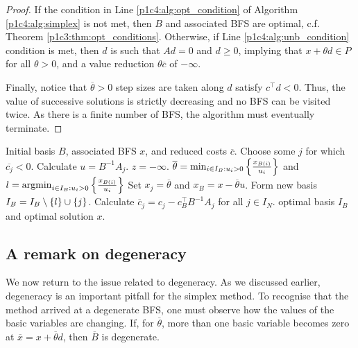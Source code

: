 \begin{proof}
	If the condition in Line \ref{p1c4:alg:opt_condition} of Algorithm \ref{p1c4:alg:simplex} is not met, then $B$ and associated BFS are optimal, c.f. Theorem \ref{p1c3:thm:opt_conditions}. Otherwise, if Line \ref{p1c4:alg:unb_condition} condition is met, then $d$ is such that $Ad = 0$ and $d \geq 0$, implying that $x + \theta d \in P$ for all $\theta > 0$, and a value reduction $\theta\overline{c}$ of $-\infty$.
	
	Finally, notice that $\overline{\theta}>0$ step sizes are taken along $d$ satisfy $c^\top d < 0$. Thus, the value of successive solutions is strictly decreasing and no BFS can be visited twice. As there is a finite number of BFS, the algorithm must eventually terminate.
\end{proof}

\begin{algorithm}[h]
	\caption{Simplex method} \label{p1c4:alg:simplex}
	\begin{algorithmic}[1] %
		 Initial basis $B$, associated BFS $x$, and reduced costs $\overline{c}$.
		 \label{p1c4:alg:opt_condition} 
		    \State Choose some $j$ for which $\overline{c_j} < 0$. Calculate $u = B^{-1}A_j$. 
		     \label{p1c4:alg:unb_condition}
				 $z = -\infty$.		
			\Else
				\State $\overline{\theta} = \min_{i \in I_B : u_i > 0} \left\{ \frac{x_{B(i)}}{u_i} \right \}$ and $l = \mathop{\rm argmin}_{i \in I_B : u_i > 0} \left\{ \frac{x_{B(i)}}{u_i} \right \}$ 
				\State Set $x_j = \overline{\theta}$ and $x_B = x - \overline{\theta}u$. Form new basis $I_B = I_B \setminus \left\{ l \right \} \cup \left\{ j \right \}$.  
				\State Calculate $\overline{c}_j = c_j - c_B^\top B^{-1}A_j$ for all $j \in I_N$.
			\EndIf
		\EndWhile
		 optimal basis $I_B$ and optimal solution $x$.
	\end{algorithmic}
\end{algorithm}


\subsection{A remark on degeneracy}

We now return to the issue related to degeneracy. As we discussed earlier, degeneracy is an important pitfall for the simplex method. To recognise that the method arrived at a degenerate BFS, one must observe how the values of the basic variables are changing. If, for $\overline{\theta}$, more than one basic variable becomes zero at $\overline{x} = x +\overline{\theta}d$, then $\overline{B}$ is degenerate.

